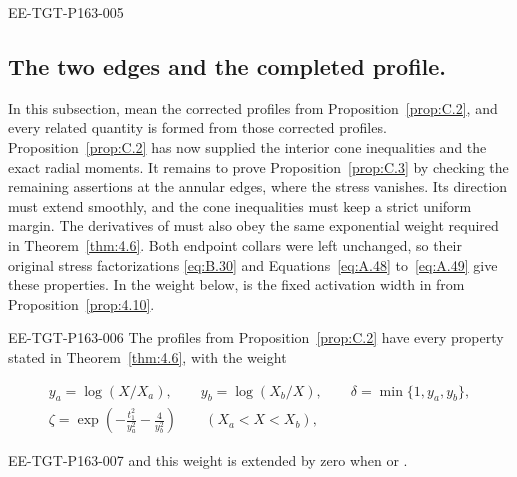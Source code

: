 \begin{EESegment}{EE-TGT-P163-005}
\subsection{The two edges and the completed profile.}\label{sec:C.3}

In this subsection,  mean the corrected
profiles from Proposition~\ref{prop:C.2}, and every related quantity is formed from those corrected profiles. Proposition~\ref{prop:C.2} has now supplied the interior cone inequalities and the exact radial moments.
It remains to prove Proposition~\ref{prop:C.3} by checking the remaining assertions at the annular
edges, where the stress  vanishes. Its direction
 must extend smoothly, and the cone inequalities must keep a strict uniform margin. The derivatives of  must also obey the same
exponential weight  required in
Theorem~\ref{thm:4.6}. Both endpoint collars were left unchanged, so their original stress factorizations \eqref{eq:B.30} and
Equations~\eqref{eq:A.48} to~\eqref{eq:A.49} give these properties. In the weight below,
 is the fixed activation width in
 from Proposition~\ref{prop:4.10}.
\end{EESegment}

\begin{proposition}\label{prop:C.3}
\begin{EESegment}{EE-TGT-P163-006}
The profiles from Proposition~\ref{prop:C.2} have every property stated in
Theorem~\ref{thm:4.6}, with the weight
\end{EESegment}
\begin{equation}
\begin{gathered}
  y_a=\log(X/X_a),
  \qquad y_b=\log(X_b/X),
  \qquad \delta=\min\{1,y_a,y_b\},\\
  \zeta=\exp\!\left(-\frac{t_1^2}{y_a^2}-\frac{4}{y_b^2}\right)
  \qquad (X_a<X<X_b),
\end{gathered}
\tag{C.18}\label{eq:C.18}
\end{equation}
\begin{EESegment}{EE-TGT-P163-007}
and this weight is extended by zero when  or
.
\end{EESegment}
\end{proposition}


